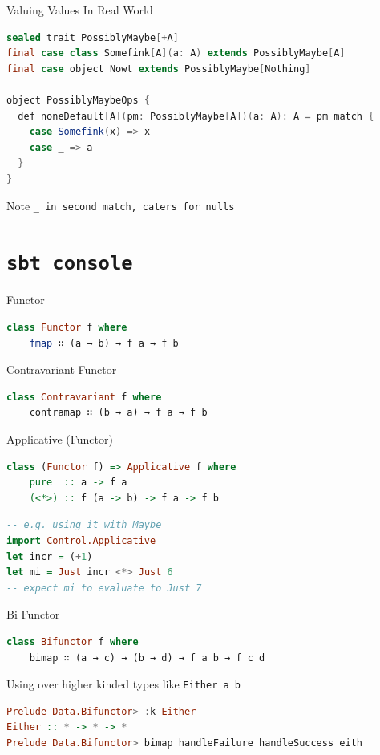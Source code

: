 \documentclass[compress]{beamer}
\begin{document}
\begin{frame}[containsverbatim]{Valuing Values In Real World}
\begin{lstlisting}[language=java]
sealed trait PossiblyMaybe[+A]
final case class Somefink[A](a: A) extends PossiblyMaybe[A]
final case object Nowt extends PossiblyMaybe[Nothing]

object PossiblyMaybeOps {
  def noneDefault[A](pm: PossiblyMaybe[A])(a: A): A = pm match {
    case Somefink(x) => x
    case _ => a
  }
}
\end{lstlisting}
  \small{Note \tt{\_} in second match, caters for \tt{null}s}
\end{frame}

\section{\tt{sbt console}}

\begin{frame}[containsverbatim]{Functor}
\begin{lstlisting}[language=haskell]
class Functor f where
    fmap ∷ (a → b) → f a → f b
\end{lstlisting}
\end{frame}

\begin{frame}[containsverbatim]{Contravariant Functor}
\begin{lstlisting}[language=haskell]
class Contravariant f where
    contramap ∷ (b → a) → f a → f b
\end{lstlisting}
\end{frame}

\begin{frame}[containsverbatim]{Applicative (Functor)}
\begin{lstlisting}[language=haskell]
class (Functor f) => Applicative f where
    pure  :: a -> f a
    (<*>) :: f (a -> b) -> f a -> f b
\end{lstlisting}

\begin{lstlisting}[language=haskell]
-- e.g. using it with Maybe
import Control.Applicative
let incr = (+1)
let mi = Just incr <*> Just 6
-- expect mi to evaluate to Just 7
\end{lstlisting}
\end{frame}

\begin{frame}[containsverbatim]{Bi Functor}
\begin{lstlisting}[language=haskell]
class Bifunctor f where
    bimap ∷ (a → c) → (b → d) → f a b → f c d
\end{lstlisting}
\small{Using over higher kinded types like \tt{Either a b}}
\begin{lstlisting}[language=haskell]
Prelude Data.Bifunctor> :k Either
Either :: * -> * -> *
Prelude Data.Bifunctor> bimap handleFailure handleSuccess eith
\end{lstlisting}
\end{frame}
\end{document}
